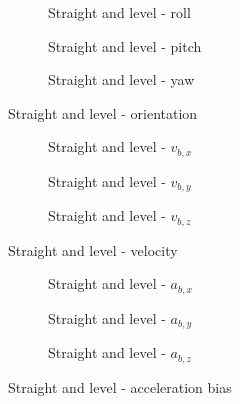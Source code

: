 \begin{figure}[!ht]
    \centering
    \begin{subfigure}{0.3\textwidth}
        
        \caption{Straight and level - roll}
    \end{subfigure}
    \hfill
    \begin{subfigure}{0.3\textwidth}
        
        \caption{Straight and level - pitch}
    \end{subfigure}
    \hfill
    \begin{subfigure}{0.3\textwidth}
        
        \caption{Straight and level - yaw}
    \end{subfigure}
    \caption{Straight and level - orientation}
    \label{fig:straight-level-ori}
\end{figure}

\begin{figure}[!ht]
    \centering
    \begin{subfigure}{0.3\textwidth}
        
        \caption{Straight and level - $v_{b,x}$}
    \end{subfigure}
    \hfill
    \begin{subfigure}{0.3\textwidth}
        
        \caption{Straight and level - $v_{b,y}$}
    \end{subfigure}
    \hfill
    \begin{subfigure}{0.3\textwidth}
        
        \caption{Straight and level - $v_{b,z}$}
    \end{subfigure}
    \caption{Straight and level - velocity}
    \label{fig:straight-level-vel}
\end{figure}

\begin{figure}[!ht]
    \centering
    \begin{subfigure}{0.3\textwidth}
        
        \caption{Straight and level - $a_{b,x}$}
    \end{subfigure}
    \hfill
    \begin{subfigure}{0.3\textwidth}
        
        \caption{Straight and level - $a_{b,y}$}
    \end{subfigure}
    \hfill
    \begin{subfigure}{0.3\textwidth}
        
        \caption{Straight and level - $a_{b,z}$}
    \end{subfigure}
    \caption{Straight and level - acceleration bias}
    \label{fig:straight-level-abias}
\end{figure}

